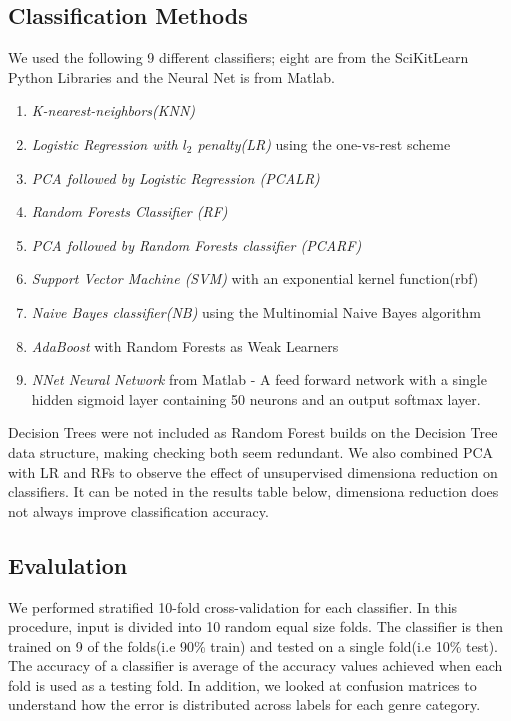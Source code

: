 \documentclass{article} %
\begin{document}
\subsection{Classification Methods}
We used the following 9 different classifiers; eight are from the SciKitLearn Python Libraries and the Neural Net is from Matlab. 
\begin{enumerate}
    \item \textit{K-nearest-neighbors(KNN)} 
    \item \textit{Logistic Regression with $l_2$ penalty(LR)} using the one-vs-rest scheme 
    \item \textit{PCA followed by Logistic Regression (PCALR)}
    \item \textit{Random Forests Classifier (RF) }
    \item \textit{PCA followed by Random Forests classifier (PCARF) }
    \item \textit{Support Vector Machine (SVM)} with an exponential kernel function(rbf) 
    \item \textit{Naive Bayes classifier(NB)} using the Multinomial Naive Bayes algorithm
    \item \textit{AdaBoost} with Random Forests as Weak Learners
    \item \textit{NNet Neural Network} from Matlab - A feed forward network with a single hidden sigmoid layer containing 50 neurons and an output softmax layer.
\end{enumerate}
Decision Trees were not included as Random Forest builds on the Decision Tree data structure, making checking both seem redundant. We also combined PCA with LR and RFs to observe the effect of unsupervised dimensiona reduction on classifiers. It can be noted in the results table below, dimensiona reduction does not always improve classification accuracy. 

\subsection{Evalulation}
We performed stratified 10-fold cross-validation for each classifier. In this procedure, input is divided into 10 random equal size folds. The classifier is then trained on 9 of the folds(i.e 90\% train) and tested on a single fold(i.e 10\% test). The accuracy of a classifier is average of the accuracy values achieved when each fold is used as a testing fold. In addition, we looked at confusion matrices to understand how the error is distributed across labels for each genre category.
\end{document}
